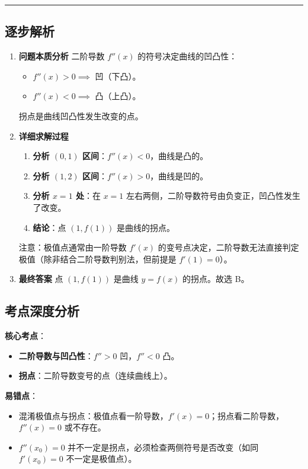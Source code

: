 \documentclass[UTF8,10pt]{ctexart}
\newenvironment{redenv}{\color{red}}{}
\newenvironment{detailedanalysis}{%
    \color{red}
    \begin{enumerate}[label=\textbf{第\arabic*步：}, leftmargin=*, align=left, itemsep=0pt, parsep=0pt, topsep=0pt, partopsep=0pt]
}{%
    \end{enumerate}
}
\newenvironment{conceptbox}{%
    \begin{tcolorbox}[colback=red!5, colframe=red!50!black, title=概念解析, fonttitle=\bfseries, top=2pt, bottom=2pt, left=2pt, right=2pt]
}{%
    \end{tcolorbox}
}
\newcommand{\analysisrule}{\noindent\rule{\textwidth}{0.8pt}\vspace{-0.5em}}
\begin{document}
\begin{redenv}
\analysisrule
\subsection*{逐步解析}

\begin{detailedanalysis}
\item \textbf{问题本质分析}
二阶导数 $f''(x)$ 的符号决定曲线的凹凸性：
\begin{itemize}
    \item $f''(x) > 0 \implies$ 凹（下凸）。
    \item $f''(x) < 0 \implies$ 凸（上凸）。
\end{itemize}
拐点是曲线凹凸性发生改变的点。

\item \textbf{详细求解过程}
\begin{enumerate}[label=(\alph*)]
    \item \textbf{分析 $(0,1)$ 区间}：$f''(x) < 0$，曲线是凸的。
    \item \textbf{分析 $(1,2)$ 区间}：$f''(x) > 0$，曲线是凹的。
    \item \textbf{分析 $x=1$ 处}：在 $x=1$ 左右两侧，二阶导数符号由负变正，凹凸性发生了改变。
    \item \textbf{结论}：点 $(1, f(1))$ 是曲线的拐点。
\end{enumerate}
注意：极值点通常由一阶导数 $f'(x)$ 的变号点决定，二阶导数无法直接判定极值（除非结合二阶导数判别法，但前提是 $f'(1)=0$）。

\item \textbf{最终答案}
点 $(1, f(1))$ 是曲线 $y = f(x)$ 的拐点。故选 B。
\end{detailedanalysis}

\subsection*{考点深度分析}
\begin{conceptbox}
\textbf{核心考点}：
\begin{itemize}
    \item \textbf{二阶导数与凹凸性}：$f'' > 0$ 凹，$f'' < 0$ 凸。
    \item \textbf{拐点}：二阶导数变号的点（连续曲线上）。
\end{itemize}
\textbf{易错点}：
\begin{itemize}
    \item 混淆极值点与拐点：极值点看一阶导数，$f'(x)=0$；拐点看二阶导数，$f''(x)=0$ 或不存在。
    \item $f''(x_0)=0$ 并不一定是拐点，必须检查两侧符号是否改变（如同 $f'(x_0)=0$ 不一定是极值点）。
\end{itemize}
\end{conceptbox}
\end{redenv}
\end{document}

